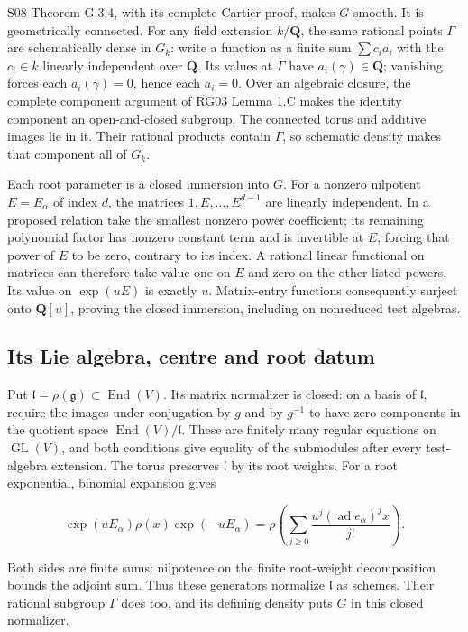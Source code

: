 \documentclass[11pt,a4paper,openany]{report}
\begin{document}
S08 Theorem G.3.4, with its complete Cartier proof, makes \(G\) smooth. It is geometrically connected. For any field extension \(k/\mathbf Q\), the same rational points \(\Gamma\) are schematically dense in \(G_k\): write a function as a finite sum \(\sum c_i a_i\) with the \(c_i\in k\) linearly independent over \(\mathbf Q\). Its values at \(\Gamma\) have \(a_i(\gamma)\in\mathbf Q\); vanishing forces each \(a_i(\gamma)=0\), hence each \(a_i=0\). Over an algebraic closure, the complete component argument of RG03 Lemma 1.C makes the identity component an open-and-closed subgroup. The connected torus and additive images lie in it. Their rational products contain \(\Gamma\), so schematic density makes that component all of \(G_k\).

Each root parameter is a closed immersion into \(G\). For a nonzero nilpotent \(E=E_\alpha\) of index \(d\), the matrices \(1,E,\ldots,E^{d-1}\) are linearly independent. In a proposed relation take the smallest nonzero power coefficient; its remaining polynomial factor has nonzero constant term and is invertible at \(E\), forcing that power of \(E\) to be zero, contrary to its index. A rational linear functional on matrices can therefore take value one on \(E\) and zero on the other listed powers. Its value on \(\exp(uE)\) is exactly \(u\). Matrix-entry functions consequently surject onto \(\mathbf Q[u]\), proving the closed immersion, including on nonreduced test algebras.

\subsection{Its Lie algebra, centre and root datum}\label{AG-RG-05-its-lie-algebra-centre-and-root-datum}

Put \(\mathfrak l=\rho(\mathfrak g)\subset\operatorname{End}(V)\). Its matrix normalizer is closed: on a basis of \(\mathfrak l\), require the images under conjugation by \(g\) and by \(g^{-1}\) to have zero components in the quotient space \(\operatorname{End}(V)/\mathfrak l\). These are finitely many regular equations on \(\operatorname{GL}(V)\), and both conditions give equality of the submodules after every test-algebra extension. The torus preserves \(\mathfrak l\) by its root weights. For a root exponential, binomial expansion gives

\[
\exp(uE_\alpha)\rho(x)\exp(-uE_\alpha)
=\rho\left(\sum_{j\ge0}\frac{u^j(\operatorname{ad}e_\alpha)^j x}{j!}\right).
\]

Both sides are finite sums: nilpotence on the finite root-weight decomposition bounds the adjoint sum. Thus these generators normalize \(\mathfrak l\) as schemes. Their rational subgroup \(\Gamma\) does too, and its defining density puts \(G\) in this closed normalizer.
\end{document}
